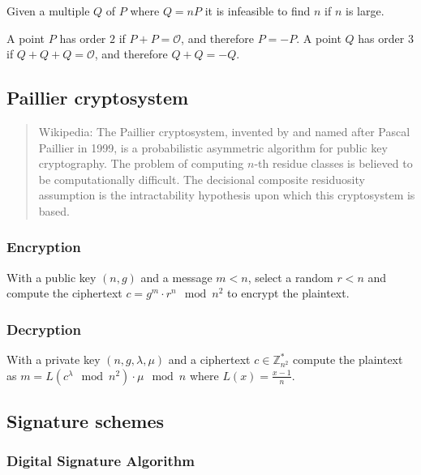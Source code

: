 \begin{lemma}
  Given a multiple $Q$ of $P$ where $Q = nP$ it is infeasible to find $n$ if $n$ is large.
\end{lemma}

\begin{lemma}
  A point $P$ has order $2$ if $P + P = \mathcal{O}$, and therefore $P = -P$.
  A point $Q$ has order $3$ if $Q+Q+Q=\mathcal{O}$, and therefore $Q + Q = -Q$.
\end{lemma}


\subsection{Paillier cryptosystem}

\begin{quote}{Wikipedia:}
  The Paillier cryptosystem, invented by and named after Pascal Paillier in 1999,
  is a probabilistic asymmetric algorithm for public key cryptography. The problem
  of computing $n$-th residue classes is believed to be computationally difficult.
  The decisional composite residuosity assumption is the intractability hypothesis
  upon which this cryptosystem is based.
\end{quote}

\subsubsection{Encryption}

With a public key $(n, g)$ and a message $m < n$, select a random $r < n$ and
compute the ciphertext $c = g^m \cdot r^n \mod n^2$ to encrypt the plaintext.

\subsubsection{Decryption}

With a private key $(n, g, \lambda, \mu)$ and a ciphertext $c \in
\mathbb{Z}_{n^2}^*$ compute the plaintext as $m = L(c^{\lambda} \mod n^2) \cdot
\mu \mod n$ where $L(x) = \frac{x-1}{n}$.

\subsection{Signature schemes}
\subsubsection{Digital Signature Algorithm}

